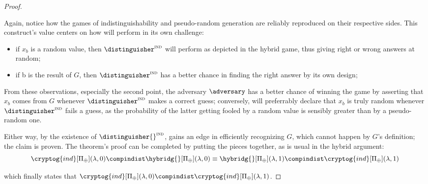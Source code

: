 \begin{proof}
\begin{cryptoredux}



        \cseqdelay

    \end{cryptoredux}

    Again, notice how the games of indistinguishability and pseudo-random generation are reliably reproduced on their respective sides. This construct's value centers on how  will perform in its own challenge:
    \begin{itemize}
        \item if $x_b$ is a random value, then $\distinguisher^\textsc{ind}$ will perform as depicted in the hybrid game, thus giving right or wrong answers at random;
        \item if b is the result of $G$, then $\distinguisher^\textsc{ind}$ has a better chance in finding the right answer by its own design;
    \end{itemize}
    From these observations, especially the second point, the adversary $\adversary$ has a better chance of winning the \prg{} game by asserting that $x_b$ comes from $G$ whenever $\distinguisher^\textsc{ind}$ makes a correct guess; conversely, \adversary{} will preferrably declare that $x_b$ is truly random whenever $\distinguisher^\textsc{ind}$ fails a guess, as the probability of the latter getting fooled by a random value is sensibly greater than by a pseudo-random one.

    Either way, by the existence of $\distinguisher{}^\textsc{ind}$, \adversary{} gains an edge in efficiently recognizing $G$, which cannot happen by $G$'s definition; the claim is proven. The theorem's proof can be completed by putting the pieces together, as is usual in the hybrid argument:
    \[
        \cryptog{ind}[\Pi_\xor](\lambda, 0) \compindist
        \hybridg{}[\Pi_\xor](\lambda, 0) \equiv
        \hybridg{}[\Pi_\xor](\lambda, 1) \compindist
        \cryptog{ind}[\Pi_\xor](\lambda, 1)
    \]

    which finally states that $\cryptog{ind}[\Pi_\xor](\lambda, 0) \compindist \cryptog{ind}[\Pi_\xor](\lambda, 1)$.
\end{proof}
 

